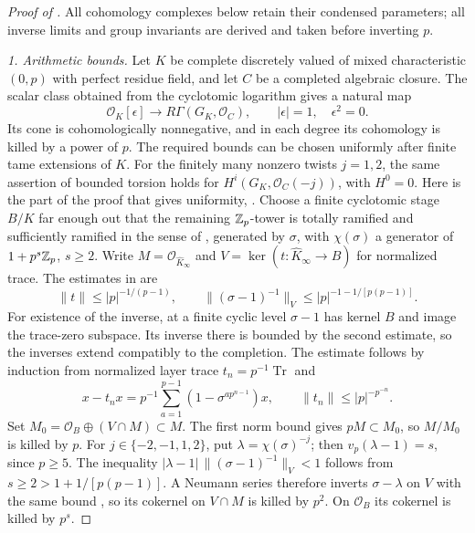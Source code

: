 \begin{proof}[Proof of ]
All cohomology complexes below retain their condensed parameters;
all inverse limits and group invariants are derived and taken
before inverting $p$.

\medskip\noindent\emph{1. Arithmetic bounds.} Let
$K$ be complete discretely valued of mixed characteristic $(0,p)$
with perfect residue field, and let $C$ be a completed algebraic
closure.  The scalar class obtained from the cyclotomic logarithm
gives a natural map
\[
 \mathcal O_K[\epsilon]\longrightarrow
 R\Gamma(G_K,\mathcal O_C),\qquad |\epsilon|=1,
 \quad \epsilon^2=0.
\]
Its cone is cohomologically nonnegative, and in each degree its
cohomology is killed by a power of $p$.  The required bounds can
be chosen uniformly after finite tame extensions of $K$.
For the finitely many nonzero twists $j=1,2$, the same assertion
of bounded torsion holds for $H^i(G_K,\mathcal O_C(-j))$, with
$H^0=0$.  Here is the part of the proof that gives uniformity,
\cite[Sections~4.2--4.4]{BSSW}.  Choose a finite cyclotomic stage $B/K$ far enough out that the
remaining $\mathbb Z_p$-tower is totally ramified and sufficiently ramified
in the sense of \cite[Definition~4.2.5 and Lemma~4.2.6]{BSSW}, generated
by $\sigma$, with $\chi(\sigma)$ a generator of $1+p^s\mathbb Z_p$,
$s\geq2$.  Write $M=\mathcal O_{\widehat K_\infty}$ and
$V=\ker(t:\widehat K_\infty\to B)$ for normalized trace.
The estimates in \cite[(4.2.9), (4.2.15), Lemmas~4.2.12 and
4.2.17, and the proof of Proposition~4.2.18]{BSSW} are
\[
 \|t\|\leq |p|^{-1/(p-1)},\qquad
 \|(\sigma-1)^{-1}\|_V
       \leq |p|^{-1-1/[p(p-1)]}.
\]
For existence of the inverse, at a finite cyclic level
$\sigma-1$ has kernel $B$ and image the trace-zero subspace.
Its inverse there is bounded by the second estimate, so the
inverses extend compatibly to the completion.  The estimate follows
by induction from normalized layer trace
$t_n=p^{-1}\operatorname{Tr}$ and
\[
 x-t_nx=p^{-1}\sum_{a=1}^{p-1}
       (1-\sigma^{a p^{n-1}})x,\qquad
 \|t_n\|\leq |p|^{-p^{-n}}.
\]
Set $M_0=\mathcal O_B\oplus(V\cap M)\subset M$.
The first norm bound gives $pM\subset M_0$, so $M/M_0$ is killed
by $p$.  For $j\in\{-2,-1,1,2\}$, put
$\lambda=\chi(\sigma)^{-j}$;
then $v_p(\lambda-1)=s$, since $p\geq5$.
The inequality
$|\lambda-1|\,\|(\sigma-1)^{-1}\|_V<1$ follows from
$s\geq2>1+1/[p(p-1)]$.  A Neumann series therefore inverts
$\sigma-\lambda$ on $V$ with the same bound
\cite[Lemma~4.4.1]{BSSW}, so its cokernel on $V\cap M$ is killed by $p^2$.
On $\mathcal O_B$ its cokernel is killed by $p^s$.

\end{proof}
